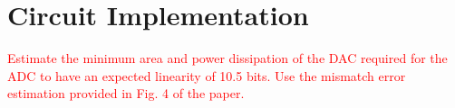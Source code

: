 \section{Circuit Implementation}
\label{sec:implementation}
\textcolor{red}{Estimate the minimum area and power dissipation of the DAC
required for the ADC to have an expected linearity of 10.5 bits. Use the
mismatch error estimation provided in Fig. 4 of the paper.}
